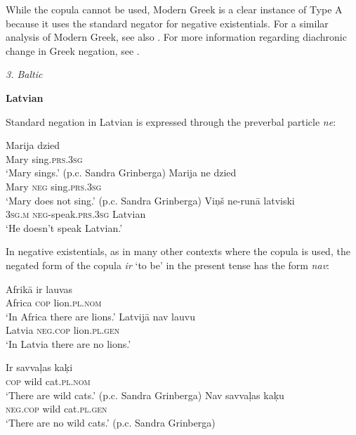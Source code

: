 \documentclass[output=paper]{langsci/langscibook}
\begin{document}
\begin{unindented}
While the copula cannot be used, Modern Greek is a clear instance of Type A
because it uses the standard negator for negative existentials. For a
similar analysis of Modern Greek, see also
\citet[115--116]{Veselinova2013}.  For more information regarding
diachronic change in Greek negation, see \citet{KiparskyCondoravdi2006-ieur}. 

\textit{3. Baltic}

\textbf{Latvian}

Standard negation in Latvian is expressed through the preverbal particle \textit{ne}: 
%
\begin{exe}\ex \gll Marija dzied \\
Mary sing.\textsc{prs.3sg} \\
    \glt `Mary sings.' (p.c. Sandra Grinberga)
\ex \gll Marija   ne   dzied \\
Mary \textsc{neg} sing.\textsc{prs.3sg} \\
    \glt `Mary does not sing.' (p.c. Sandra Grinberga)
\ex \gll Viņš ne-runā latviski \\
\textsc{3sg}.\textsc{m} \textsc{neg}-speak.\textsc{prs.3sg} Latvian \\
    \glt `He doesn't speak Latvian.' \citep[164]{Mathiassen1997}
    \end{exe}

In negative existentials, as in many other contexts where the copula is used, the negated form of the copula \textit{ir} `to be' in the present tense has the form \textit{nav}: 
%
\begin{exe}\ex \gll Afrikā ir lauvas \\
Africa \textsc{cop} lion.\textsc{pl.nom} \\
    \glt `In Africa there are lions.' \citep[164]{Mathiassen1997}
\ex \gll Latvijā nav lauvu \\
Latvia \textsc{neg.cop} lion.\textsc{pl.gen} \\
    \glt `In Latvia there are no lions.' \citep[164]{Mathiassen1997}
\ex\begin{xlist}
\ex \gll Ir savvaļas kaķi \\
\textsc{cop} wild cat.\textsc{pl.nom} \\
    \glt `There are wild cats.' (p.c. Sandra Grinberga)
\ex\gll Nav savvaļas kaķu\\
\textsc{neg}.\textsc{cop} wild cat.\textsc{pl.gen}\\
\glt `There are no wild cats.' (p.c. Sandra Grinberga)
    \end{xlist}\end{exe}


\end{unindented}
\end{document}
